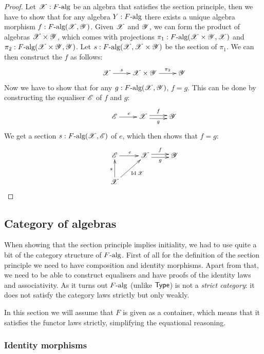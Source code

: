\documentclass[a4paper,10pt]{article}
\begin{document}
\begin{proof}
  Let $\mathscr{X} : F\mbox{-alg}$ be an algebra that satisfies the section
  principle, then we have to show that for any algebra
  $Y : F\mbox{-alg}$ there exists a unique algebra morphism
  $f : F\mbox{-alg}(\mathscr{X},\mathscr{Y})$. Given $\mathscr{X}$ and $\mathscr{Y}$, we
  can form the product of algebras $\mathscr{X} \times \mathscr{Y}$, which
  comes with projections
  $\pi_1 : F\mbox{-alg}(\mathscr{X} \times \mathscr{Y}, \mathscr{X})$ and
  $\pi_2 : F\mbox{-alg}(\mathscr{X} \times \mathscr{Y}, \mathscr{Y})$. Let
  $s : F\mbox{-alg}(\mathscr{X},\mathscr{X} \times \mathscr{Y})$ be the section of
  $\pi_1$. We can then construct the $f$ as follows:
$$
\xymatrix{ &\alg{X} \ar[r]^-{s} &\alg{X} \times \alg{Y}
  \ar[r]^-{\pi_2} &\alg{Y} }
$$
Now we have to show that for any $g : F\mbox{-alg}(\mathscr{X},\mathscr{Y})$,
$f = g$. This can be done by constructing the equaliser $\mathscr{E}$ of
$f$ and $g$:
$$
\xymatrix{ &\alg{E} \ar[r]^{e} &\alg{X} \ar@<-.5ex>[r]_-{g}
  \ar@<.5ex>[r]^-{f} &\alg{Y} }
$$
We get a section $s : F\mbox{-alg}(\mathscr{X},\mathscr{E})$ of $e$, which then
shows that $f = g$:
$$
\xymatrix{
  &\alg{E} \ar[r]^{e} &\alg{X} \ar@<-.5ex>[r]_-{g} \ar@<.5ex>[r]^-{f} &\alg{Y} \\
  &\alg{X} \ar[u]^{s} \ar[ur]_{\Id{\alg{X}}} }
$$
\end{proof}

\subsection{Category of algebras}
\label{sec:oitalgcat}

When showing that the section principle implies initiality, we had to
use quite a bit of the category structure of $F\mbox{-alg}$. First of
all for the definition of the section principle we need to have
composition and identity morphisms. Apart from that, we need to be
able to construct equalisers and have proofs of the identity laws and
associativity. As it turns out $F\mbox{-alg}$ (unlike $\mathsf{Type}$) is not a
\emph{strict category}: it does not satisfy the category laws strictly
but only weakly.

In this section we will assume that $F$ is given as a container, which
means that it satisfies the functor laws strictly, simplifying the
equational reasoning.

\subsubsection{Identity morphisms}
\end{document}
